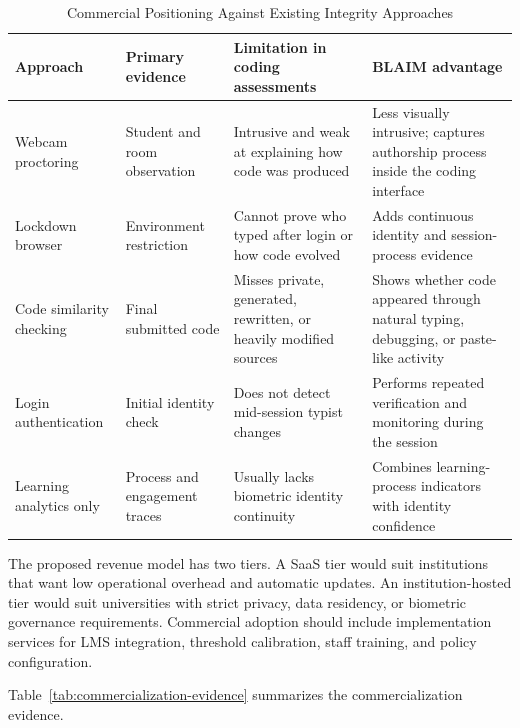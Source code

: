 \begin{table}[H]
  \centering
  \caption{Commercial Positioning Against Existing Integrity Approaches}
  \label{tab:commercial-positioning}
  \begin{singlespace}
  \scriptsize
  \begin{tabularx}{\textwidth}{@{}p{2.7cm}p{3.0cm}p{3.8cm}p{3.7cm}@{}}
    \toprule
    \textbf{Approach} & \textbf{Primary evidence} & \textbf{Limitation in coding assessments} & \textbf{BLAIM advantage} \\
    \midrule
    Webcam proctoring & Student and room observation & Intrusive and weak at explaining how code was produced & Less visually intrusive; captures authorship process inside the coding interface \\
    Lockdown browser & Environment restriction & Cannot prove who typed after login or how code evolved & Adds continuous identity and session-process evidence \\
    Code similarity checking & Final submitted code & Misses private, generated, rewritten, or heavily modified sources & Shows whether code appeared through natural typing, debugging, or paste-like activity \\
    Login authentication & Initial identity check & Does not detect mid-session typist changes & Performs repeated verification and monitoring during the session \\
    Learning analytics only & Process and engagement traces & Usually lacks biometric identity continuity & Combines learning-process indicators with identity confidence \\
    \bottomrule
  \end{tabularx}
  \end{singlespace}
\end{table}

The proposed revenue model has two tiers. A SaaS tier would suit institutions that want low operational overhead and automatic updates. An institution-hosted tier would suit universities with strict privacy, data residency, or biometric governance requirements. Commercial adoption should include implementation services for LMS integration, threshold calibration, staff training, and policy configuration.

Table~\ref{tab:commercialization-evidence} summarizes the commercialization evidence.

